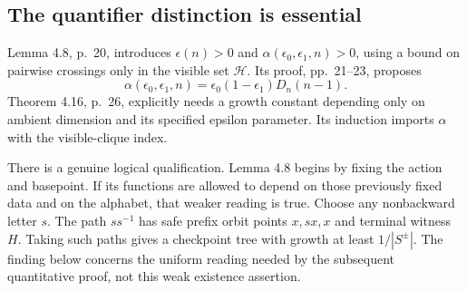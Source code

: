 \documentclass[10pt]{article}
\begin{document}
\subsection*{The quantifier distinction is essential}
Lemma 4.8, p. 20, introduces \(\epsilon(n)>0\) and \(\alpha(\epsilon_0,\epsilon_1,n)>0\), using a bound on pairwise crossings only in the visible set \(\mathcal H\). Its proof, pp. 21–23, proposes \[\alpha(\epsilon_0,\epsilon_1,n)
   =\epsilon_0(1-\epsilon_1)D_n(n-1).\] Theorem 4.16, p. 26, explicitly needs a growth constant depending only on ambient dimension and its specified epsilon parameter. Its induction imports \(\alpha\) with the visible-clique index.\par
There is a genuine logical qualification. Lemma 4.8 begins by fixing the action and basepoint. If its functions are allowed to depend on those previously fixed data and on the alphabet, that weaker reading is true. Choose any nonbackward letter \(s\). The path \(ss^{-1}\) has safe prefix orbit points \(x,sx,x\) and terminal witness \(H\). Taking such paths gives a checkpoint tree with growth at least \(1/|S^\pm|\). The finding below concerns the uniform reading needed by the subsequent quantitative proof, not this weak existence assertion.\par
\end{document}
